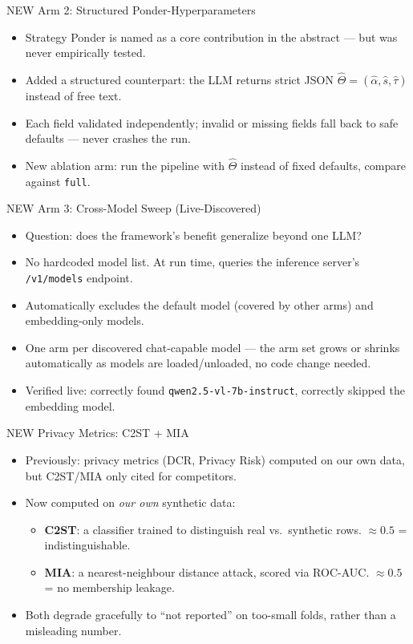 \documentclass[aspectratio=169, 11pt]{beamer}
\begin{document}
\begin{frame}{NEW Arm 2: Structured Ponder-Hyperparameters}
\begin{itemize}
\item Strategy Ponder is named as a core contribution in the abstract --- but was \alert{never empirically tested}.
\item Added a structured counterpart: the LLM returns strict JSON $\hat\Theta = (\hat\alpha, \hat s, \hat\tau)$ instead of free text.
\item Each field validated independently; invalid or missing fields fall back to safe defaults --- never crashes the run.
\item New ablation arm: run the pipeline with $\hat\Theta$ instead of fixed defaults, compare against \texttt{full}.
\end{itemize}
\end{frame}

\begin{frame}{NEW Arm 3: Cross-Model Sweep (Live-Discovered)}
\begin{itemize}
\item Question: does the framework's benefit generalize beyond one LLM?
\item \alert{No hardcoded model list.} At run time, queries the inference server's \texttt{/v1/models} endpoint.
\item Automatically excludes the default model (covered by other arms) and embedding-only models.
\item One arm per discovered chat-capable model --- the arm set grows or shrinks automatically as models are loaded/unloaded, no code change needed.
\item Verified live: correctly found \texttt{qwen2.5-vl-7b-instruct}, correctly skipped the embedding model.
\end{itemize}
\end{frame}

\begin{frame}{NEW Privacy Metrics: C2ST + MIA}
\begin{itemize}
\item Previously: privacy metrics (DCR, Privacy Risk) computed on our own data, but C2ST/MIA only \alert{cited for competitors}.
\item Now computed on \emph{our own} synthetic data:
\begin{itemize}
\item \textbf{C2ST}: a classifier trained to distinguish real vs.\ synthetic rows. $\approx 0.5$ = indistinguishable.
\item \textbf{MIA}: a nearest-neighbour distance attack, scored via ROC-AUC. $\approx 0.5$ = no membership leakage.
\end{itemize}
\item Both degrade gracefully to ``not reported'' on too-small folds, rather than a misleading number.
\end{itemize}
\end{frame}
\end{document}
